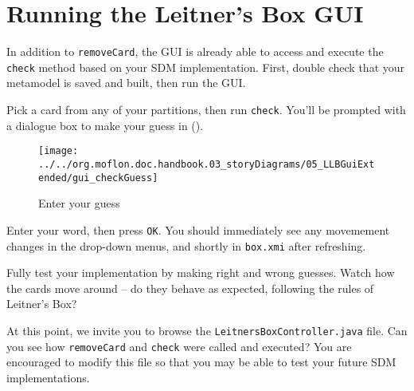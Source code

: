 \newpage
\hypertarget{sec:extendGui}{}
\section{Running the Leitner's Box GUI}
\genHeader

In addition to \texttt{removeCard}, the GUI is already able to access and execute the \texttt{check} method based on your SDM implementation. First, double
check that your metamodel is saved and built, then run the GUI. 

\begin{stepbystep}
\item Pick a card from any of your partitions, then run \texttt{check}. You'll be prompted with a dialogue box to make your guess in
().

\vspace{0.5cm}

\begin{figure}[htp]
\begin{center}
  \texttt{[image: ../../org.moflon.doc.handbook.03\_storyDiagrams/05\_LLBGuiExtended/gui\_checkGuess]}
  \caption{Enter your guess}
  \label{eclipse:checkGuess}
\end{center}
\end{figure}

\item Enter your word, then press \texttt{OK}. You should immediately see any movemement changes in the drop-down menus, and shortly in
\texttt{box.xmi} after refreshing.

\vspace{0.5cm}

\item Fully test your implementation by making right and wrong guesses. Watch how the cards move around -- do they
behave as expected, following the rules of Leitner's Box?

\vspace{0.5cm}

\item At this point, we invite you to browse the \texttt{Leitners\-Box\-Control\-ler.java} file. Can you see how \texttt{removeCard} and
\texttt{check} were called and executed? You are encouraged to modify this file so that you may be able to test your future SDM implementations.

\end{stepbystep}
